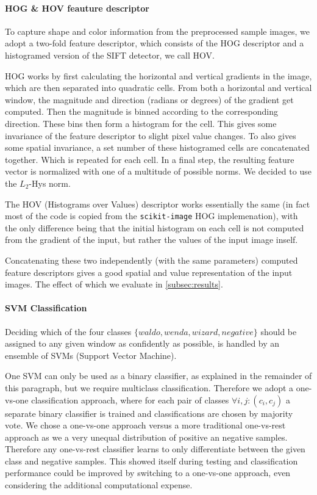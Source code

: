 \documentclass[11pt]{article}
\begin{document}
\paragraph{HOG \& HOV feauture descriptor}
To capture shape and color information from the preprocessed sample images, we adopt a two-fold feature descriptor,
which consists of the HOG descriptor and a histogramed version of the SIFT detector, we call HOV.

HOG works by first calculating the horizontal and vertical gradients in the image, which are then separated into
quadratic cells. From both a horizontal and vertical window, the magnitude and direction (radians or degrees) of the gradient get computed.
Then the magnitude is binned according to the corresponding direction. These bins then form a histogram for the cell.
This gives some invariance of the feature descriptor to slight pixel value changes.
To also gives some spatial invariance, a set number of these histogramed cells are concatenated together. Which is repeated for each cell.
In a final step, the resulting feature vector is normalized with one of a multitude of possible norms. We decided to use the \( L_2 \)-Hys norm.

The HOV (Histograms over Values) descriptor works essentially the same (in fact most of the code is copied from the \verb|scikit-image| HOG implemenation),
with the only difference being that the initial histogram on each cell is not computed from the gradient of the input,
but rather the values of the input image inself.

Concatenating these two independently (with the same parameters) computed feature descriptors gives a good spatial and
value representation of the input images. The effect of which we evaluate in \autoref{subsec:results}.


\paragraph{SVM Classification}
Deciding which of the four classes \( \{waldo, wenda, wizard, negative \} \) should be assigned to any given window
as confidently as possible, is handled by an ensemble of SVMs (Support Vector Machine)\cite{Hearst:1998:SVM:630302.630387}.

One SVM can only be used as a binary classifier, as explained in the remainder of this paragraph, but we require multiclass classification.
Therefore we adopt a one-vs-one classification approach, where for each pair of classes \( \forall i,j: (c_i,c_j) \) a separate binary classifier is trained
and classifications are chosen by majority vote. We chose a one-vs-one approach versus a more traditional one-vs-rest approach as we a very unequal distribution of
positive an negative samples. Therefore any one-vs-rest classifier learns to only differentiate between the given class and negative samples. This showed itself
during testing and classification performance could be improved by switching to a one-vs-one approach, even considering the additional computational expense.
\end{document}
